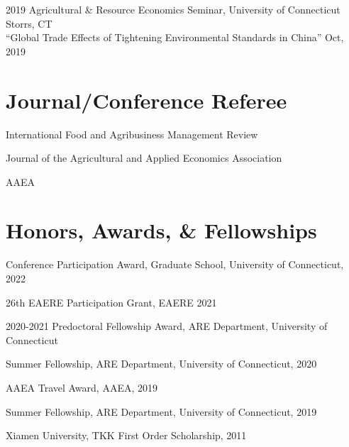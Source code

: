 \documentclass[10.5 pt,letterpaper]{article}
\renewenvironment{itemize}{
	\begin{list}{}{
			\setlength{\leftmargin}{1.5em}
		}
	}{
	\end{list}
}
\begin{document}
\begin{itemize}
		\item[-] 2019  Agricultural \& Resource Economics Seminar, University of Connecticut    \hfill  Storrs, CT\vspace{0.15cm} \\
				``Global Trade Effects of Tightening Environmental Standards in China''  \hfill Oct, 2019
	\end{itemize}	
	
	
	
	\section*{\textbf{Journal/Conference Referee}}
	
	\begin{itemize}
		\item[-]  International Food and Agribusiness Management Review
		\item[-] Journal of the Agricultural and Applied Economics Association
		\item[-]  AAEA
	\end{itemize}
	
	\section*{\textbf{Honors, Awards, \& Fellowships}}
	
	\begin{itemize}
		\item[-] Conference Participation Award, Graduate School, University of Connecticut, 2022
		\item[-] 26th EAERE Participation Grant, EAERE 2021
		\item[-] 2020-2021 Predoctoral Fellowship Award, ARE Department, University of Connecticut
		\item[-]  Summer  Fellowship, ARE Department, University of Connecticut, 2020
		\item[-] AAEA Travel Award, AAEA, 2019
		\item[-]  Summer  Fellowship, ARE Department, University of Connecticut, 2019
		\item[-] Xiamen University, TKK First Order Scholarship, 2011
		
	\end{itemize}
	
	
\end{document}
